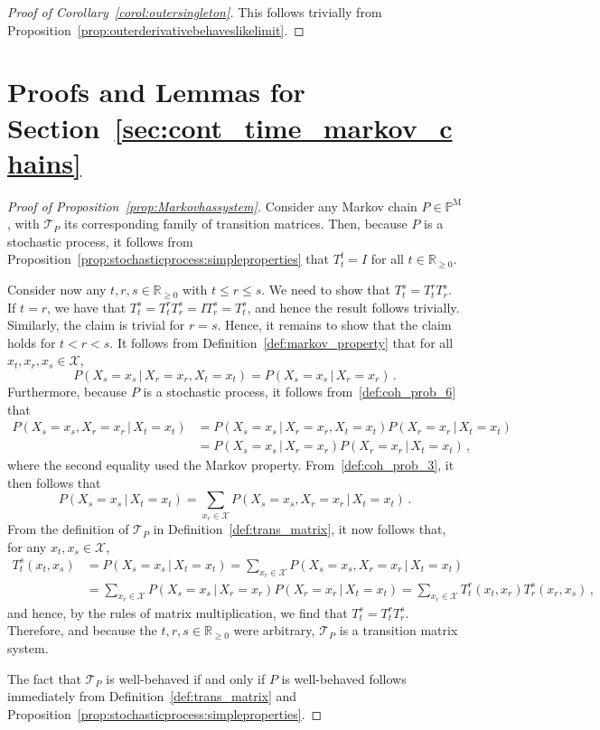\documentclass[10pt,a4paper]{paper}
\theoremstyle{definition}
\newcommand{\reals}{\mathbb{R}}
\newcommand{\realsnonneg}{\reals_{\geq 0}}
\newcommand{\states}{\mathcal{X}}
\newcommand{\processes}{\mathbb{P}}
\newcommand{\mprocesses}{\processes^{\mathrm{M}}}
\begin{document}
\begin{proof}[Proof of Corollary~\ref{corol:outersingleton}]
This follows trivially from Proposition~\ref{prop:outerderivativebehaveslikelimit}.
\end{proof}

\section{Proofs and Lemmas for Section~\ref{sec:cont_time_markov_chains}}

\begin{proof}[Proof of Proposition~\ref{prop:Markovhassystem}]
Consider any Markov chain $P\in\mprocesses$, with $\mathcal{T}_P$ its corresponding family of transition matrices. Then, because $P$ is a stochastic process, it follows from Proposition~\ref{prop:stochasticprocess:simpleproperties} that $T_t^t=I$ for all $t\in\realsnonneg$. 

Consider now any $t,r,s\in\realsnonneg$ with $t\leq r\leq s$. We need to show that $T_t^s=T_t^rT_r^s$. If $t=r$, we have that $T_t^s=T_t^rT_r^s=IT_r^s=T_t^s$, and hence the result follows trivially. Similarly, the claim is trivial for $r=s$. Hence, it remains to show that the claim holds for $t < r < s$. It follows from Definition~\ref{def:markov_property} that for all $x_t,x_r,x_s\in\states$,
\begin{equation*}
P(X_s=x_s\,\vert\,X_r=x_r,X_t=x_t) = P(X_s=x_s\,\vert\,X_r=x_r)\,.
\end{equation*}
Furthermore, because $P$ is a stochastic process, it follows from~\ref{def:coh_prob_6} that
\begin{align*}
P(X_s=x_s,X_r=x_r\,\vert\,X_t=x_t) &= P(X_s=x_s\,\vert\,X_r=x_r,X_t=x_t)P(X_r=x_r\,\vert\,X_t=x_t) \\
 &= P(X_s=x_s\,\vert\,X_r=x_r)P(X_r=x_r\,\vert\,X_t=x_t)\,,
\end{align*}
where the second equality used the Markov property. From~\ref{def:coh_prob_3}, it then follows that
\begin{equation*}
P(X_s=x_s\,\vert\,X_t=x_t) = \sum_{x_r\in\states} P(X_s=x_s,X_r=x_r\,\vert\,X_t=x_t)\,.
\end{equation*}
From the definition of $\mathcal{T}_P$ in Definition~\ref{def:trans_matrix}, it now follows that, for any $x_t,x_s\in\states$,
\begin{align*}
T_t^s(x_t,x_s) &= P(X_s=x_s\,\vert\,X_t=x_t) = \sum_{x_r\in\states} P(X_s=x_s,X_r=x_r\,\vert\,X_t=x_t) \\
 &= \sum_{x_r\in\states} P(X_s=x_s\,\vert\,X_r=x_r)P(X_r=x_r\,\vert\,X_t=x_t) = \sum_{x_r\in\states} T_t^r(x_t,x_r) T_r^s(x_r,x_s)\,,
\end{align*}
and hence, by the rules of matrix multiplication, we find that $T_t^s=T_t^rT_r^s$. Therefore, and because the $t,r,s\in\realsnonneg$ were arbitrary, $\mathcal{T}_P$ is a transition matrix system.

The fact that $\mathcal{T}_P$ is well-behaved if and only if $P$ is well-behaved follows immediately from Definition~\ref{def:trans_matrix} and Proposition~\ref{prop:stochasticprocess:simpleproperties}.
\end{proof}
\end{document}

